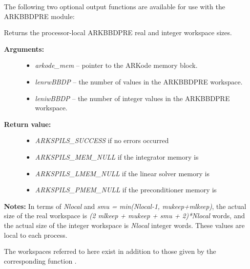 \documentclass[letterpaper,10pt,english]{sphinxmanual}
\begin{document}
The following two optional output functions are available for use with
the ARKBBDPRE module:

\begin{fulllineitems}
\label{c_interface/Preconditioners:ARKBBDPrecGetWorkSpace}
Returns the processor-local ARKBBDPRE real and
integer workspace sizes.
\begin{description}
\item[{\textbf{Arguments:}}] \leavevmode\begin{itemize}
\item {} 
\emph{arkode\_mem} -- pointer to the ARKode memory block.

\item {} 
\emph{lenrwBBDP} -- the number of  values in the
ARKBBDPRE workspace.

\item {} 
\emph{leniwBBDP} -- the number of integer values in the  ARKBBDPRE workspace.

\end{itemize}

\item[{\textbf{Return value:}}] \leavevmode\begin{itemize}
\item {} 
\emph{ARKSPILS\_SUCCESS} if no errors occurred

\item {} 
\emph{ARKSPILS\_MEM\_NULL} if the integrator memory is 

\item {} 
\emph{ARKSPILS\_LMEM\_NULL} if the linear solver memory is 

\item {} 
\emph{ARKSPILS\_PMEM\_NULL} if the preconditioner memory is 

\end{itemize}

\end{description}

\textbf{Notes:}  In terms of \emph{Nlocal} and \emph{smu = min(Nlocal-1,
mukeep+mlkeep)}, the actual size of the real workspace is \emph{(2
mlkeep + mukeep + smu + 2)*Nlocal}   words, and the
actual size of the integer workspace is \emph{Nlocal} integer
words. These values are local to each process.

The workspaces referred to here exist in addition to those given by
the corresponding function {\hyperref[c_interface/User_callable:ARKSpilsGetWorkSpace]{}}.

\end{fulllineitems}
\end{document}
